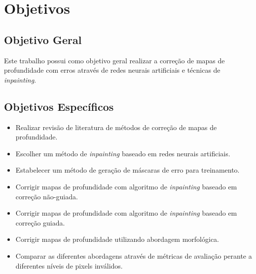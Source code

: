  
\section{Objetivos}


\subsection{Objetivo Geral}
Este trabalho possui como objetivo geral realizar a correção de mapas de profundidade com erros através de redes neurais artificiais e técnicas de \textit{inpainting}.

\subsection{Objetivos Específicos}

\begin{itemize}
    \item Realizar revisão de literatura de métodos de correção de mapas de profundidade.
    \item Escolher um método de \textit{inpainting} baseado em redes neurais artificiais.
    \item Estabelecer um método de geração de máscaras de erro para treinamento.
    \item Corrigir mapas de profundidade com algoritmo de \textit{inpainting} baseado em correção não-guiada.
    \item Corrigir mapas de profundidade com algoritmo de \textit{inpainting} baseado em correção guiada.
    \item Corrigir mapas de profundidade utilizando abordagem morfológica.
    \item Comparar as diferentes abordagens através de métricas de avaliação perante a diferentes níveis de pixels inválidos.
    
\end{itemize}

